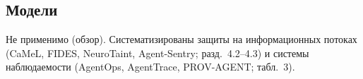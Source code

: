 \subsection{Модели}
Не применимо (обзор). Систематизированы защиты на информационных потоках (CaMeL, FIDES,
NeuroTaint, Agent-Sentry; разд.~4.2--4.3) и системы наблюдаемости (AgentOps, AgentTrace,
PROV-AGENT; табл.~3).

